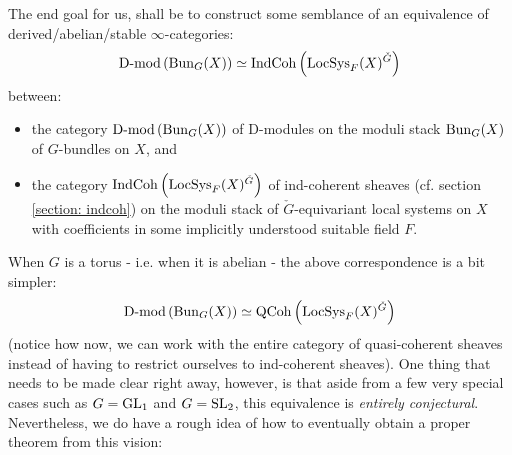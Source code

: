         The end goal for us, shall be to construct some semblance of an equivalence of derived/abelian/stable $\infty$-categories:
            $$\mathrm{D}\text{-}\mathrm{mod}\left(\mathrm{Bun}_G(X)\right) \simeq \mathrm{Ind}\mathrm{Coh}\left(\mathrm{LocSys}_F(X)^{\check{G}}\right)$$
        between:
            \begin{itemize}
                \item the category $\mathrm{D}\text{-}\mathrm{mod}\left(\mathrm{Bun}_G(X)\right)$ of D-modules on the moduli stack $\mathrm{Bun}_G(X)$ of $G$-bundles on $X$, and
                \item the category $\mathrm{Ind}\mathrm{Coh}\left(\mathrm{LocSys}_F(X)^{\check{G}}\right)$ of ind-coherent sheaves (cf. section \ref{section: indcoh}) on the moduli stack of $\check{G}$-equivariant local systems on $X$ with coefficients in some implicitly understood suitable field $F$. 
            \end{itemize}
        When $G$ is a torus - i.e. when it is abelian - the above correspondence is a bit simpler:
            $$\mathrm{D}\text{-}\mathrm{mod}\left(\mathrm{Bun}_G(X)\right) \simeq \mathrm{QCoh}\left(\mathrm{LocSys}_F(X)^{\check{G}}\right)$$
        (notice how now, we can work with the entire category of quasi-coherent sheaves instead of having to restrict ourselves to ind-coherent sheaves). One thing that needs to be made clear right away, however, is that aside from a few very special cases such as $G = \operatorname{GL}_1$ and $G = \operatorname{SL}_2$, this equivalence is \textit{entirely conjectural}. Nevertheless, we do have a rough idea of how to eventually obtain a proper theorem from this vision:
